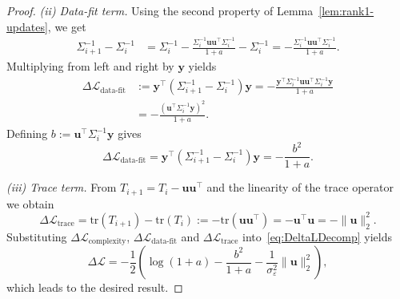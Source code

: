 \documentclass[10pt,a4paper]{amsart}
\newcommand{\tr}{\mathrm{tr}}
\begin{document}
\begin{proof}
    \noindent
    \emph{(ii) Data-fit term.}
    Using the second property of Lemma~\ref{lem:rank1-updates}, we get
    \begin{align*}
        \Sigma_{i+1}^{-1} - \Sigma_i^{-1}
        &= 
        \Sigma_i^{-1}
        -
        \frac{\Sigma_i^{-1}\bm{u} \bm{u}^\top \Sigma_i^{-1}}{1+a} - \Sigma_i^{-1}
        = -\frac{\Sigma_i^{-1}\bm{u} \bm{u}^\top \Sigma_i^{-1}}{1+a}.
    \end{align*}
    Multiplying from left and right by $\bm y$ yields
    \begin{align*}
        \Delta \mathcal{L}_{\text{data-fit}} &:=  \bm y^\top(\Sigma_{i+1}^{-1}-\Sigma_i^{-1})\bm y
        =
        -
        \frac{\bm{y}^\top \Sigma_i^{-1}\bm{u}
        \bm{u}^\top \Sigma_i^{-1}\bm{y}}{1+a}
         \nonumber \\
        &=
        - \frac{(\bm{u}^\top \Sigma_i^{-1}\bm y)^2}{1+a}.
    \end{align*}
    Defining $b := \bm{u}^\top \Sigma_i^{-1}\bm y$ gives
    \begin{equation*}
        \Delta\mathcal{L}_{\text{data-fit}} = \bm y^\top(\Sigma_{i+1}^{-1}-\Sigma_i^{-1})\bm y
        =
        -
        \frac{b^2}{1+a}.
    \end{equation*}
    
     
    \noindent
    \emph{(iii) Trace term.}
    From $T_{i+1}=T_i-\bm{u}\bm{u}^\top$ and the linearity of the trace operator we obtain
    \begin{equation*}
        \Delta \mathcal{L}_{\text{trace}} = \tr(T_{i+1})-\tr(T_i)
        := -\tr(\bm{u}\bm{u}^\top)
        = -\bm{u}^\top \bm{u}
        =-\|\bm{u}\|_2^2.
    \end{equation*}
    Substituting $\Delta\mathcal{L}_{\text{complexity}}$, $\Delta\mathcal{L}_{\text{data-fit}}$ and $\Delta\mathcal{L}_{\text{trace}}$ into~\eqref{eq:DeltaLDecomp}
    yields
    \begin{equation*}
        \Delta \mathcal L
        =
        -\frac{1}{2}\left(
        \log(1+a)
        -
        \frac{b^2}{1+a}
        -
        \frac{1}{\sigma_\varepsilon^2}\|\bm{u}\|_2^2
        \right),
    \end{equation*}
    which leads to the desired result.
\end{proof}
\end{document}

